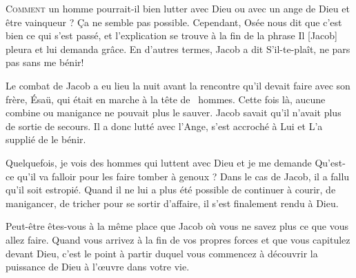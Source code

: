 \dvrule







\lettrine{C}{omment} un homme pourrait-il bien lutter avec Dieu
 \ocadr ou avec un ange de Dieu \fcadr{} et être vainqueur ?
 Ça ne semble pas possible.
 Cependant, Osée nous dit que c'est bien ce qui s'est passé,
 et l'explication se trouve à la fin de la phrase\frcolon{}
 \Og Il [Jacob] pleura et lui demanda grâce. \Fg{}
 En d'autres termes, Jacob a dit\frcolon{} 
 \Og S'il-te-plaît, ne pars pas sans me bénir! \Fg{}

Le combat de Jacob a eu lieu la nuit avant la rencontre qu'il devait
 faire avec son frère, Ésaü, qui était en marche à la tête de ~hommes.
 Cette fois là, aucune combine ou manigance ne pouvait plus le sauver.
 Jacob savait qu'il n'avait plus de sortie de secours.
 Il a donc lutté avec l'Ange, s'est accroché à Lui et L'a supplié de le bénir. 


Quelquefois, je vois des hommes qui luttent avec Dieu et je me demande\frcolon{} 
 \Og Qu'est-ce qu'il va falloir pour les faire tomber à genoux ? \Fg{}
 Dans le cas de Jacob, il a fallu qu'il soit estropié.
 Quand il ne lui a plus été possible de continuer à courir, de manigancer,
 de tricher pour se sortir d'affaire, il s'est finalement rendu à Dieu. 

Peut-être êtes-vous à la même place que Jacob où vous ne savez plus
 ce que vous allez faire. Quand vous arrivez à la fin de vos propres forces
 et que vous capitulez devant Dieu, c'est le point à partir duquel
 vous commencez à découvrir la puissance de Dieu à l'\oe{}uvre dans votre vie. 

